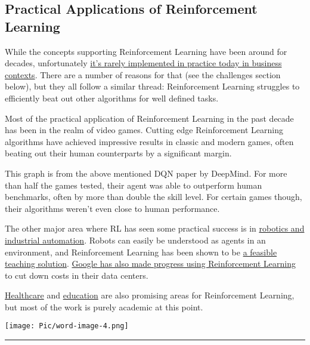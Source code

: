 \documentclass[a4paper, 11pt]{article}
\begin{document}
\subsection{\textbf{Practical Applications of Reinforcement
Learning}}

While the concepts supporting Reinforcement Learning have been around
for decades, unfortunately
\href{https://www.oreilly.com/ideas/practical-applications-of-reinforcement-learning-in-industry}{it's
rarely implemented in practice today in business contexts}. There are a
number of reasons for that (see the challenges section below), but they
all follow a similar thread: Reinforcement Learning struggles to
efficiently beat out other algorithms for well defined tasks.

Most of the practical application of Reinforcement Learning in the past
decade has been in the realm of video games. Cutting edge Reinforcement
Learning algorithms have achieved impressive results in classic and
modern games, often beating out their human counterparts by a
significant margin.

This graph is from the above mentioned DQN paper by DeepMind. For more
than half the games tested, their agent was able to outperform human
benchmarks, often by more than double the skill level. For certain games
though, their algorithms weren't even close to human performance.

The other major area where RL has seen some practical success is in
\href{https://vmayoral.github.io/robots,/ai,/deep/learning,/rl,/reinforcement/learning/2016/07/06/rl-intro/}{robotics
and industrial automation}. Robots can easily be understood as agents in
an environment, and Reinforcement Learning has been shown to be
\href{https://www.youtube.com/watch?v=ZhsEKTo7V04}{a feasible teaching
solution}.
\href{https://environment.google/projects/machine-learning/}{Google has
also made progress using Reinforcement Learning} to cut down costs in
their data centers.

\href{https://mlhc17mit.github.io/slides/lecture13.pdf}{Healthcare} and
\href{http://pact.cs.cmu.edu/pubs/New\%20potentials\%20for\%20ITS-source.pdf}{education}
are also promising areas for Reinforcement Learning, but most of the
work is purely academic at this point.

\texttt{[image: Pic/word-image-4.png]}



\begin{center}\rule{6in}{0.4pt}\end{center}
\end{document}
